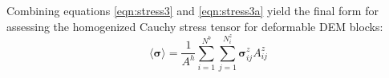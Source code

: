 Combining equations \ref{eqn:stress3} and \ref{eqn:stress3a} yield the final form for assessing the homogenized Cauchy stress tensor for deformable DEM blocks:
\begin{equation}
\label{eqn:stress4}
\langle \boldsymbol{\sigma} \rangle = 
\frac{1}{A^h} \sum_{i=1}^{N^{b}} \sum_{j=1}^{N^{z}_i} \boldsymbol{\sigma}^z_{ij} A^{z}_{ij} 
\end{equation}


